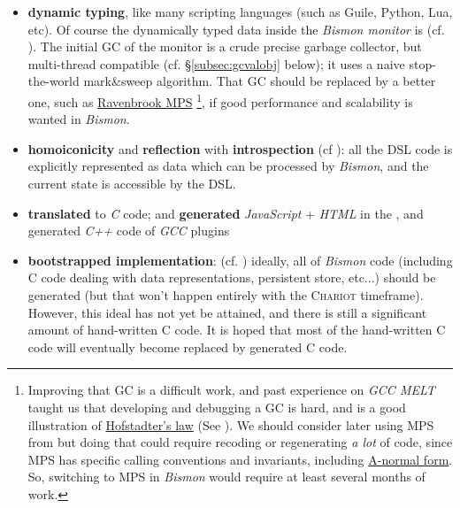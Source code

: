 \begin{itemize}
  \item \textbf{dynamic typing}, like many scripting languages (such
    as Guile, Python, Lua, etc). Of course the dynamically typed data
    inside the \textit{Bismon monitor} is 
    (cf. \cite{Jones:2011:GC-handbook}). The initial GC of the monitor
    is a crude precise garbage collector, but multi-thread compatible (cf. §\ref{subsec:gcvalobj} below);
    it uses a naive stop-the-world mark\&sweep algorithm. That GC
    should be replaced by a better one, such as
    \href{https://www.ravenbrook.com/project/mps/}{Ravenbrook MPS}
    \footnote{\label{fn:initial-gc} Improving that GC is a difficult
      work, and past experience on \emph{GCC MELT} taught us that
      developing and debugging a GC is hard, and is a good
      illustration of
      \href{https://en.wikipedia.org/wiki/Hofstadter's_law}{Hofstadter's
        law} (See \cite{Hofstadter:1979:GEB}). We should consider
      later using MPS from
       but doing that
      could require recoding or regenerating \emph{a lot} of code,
      since MPS has specific calling conventions and invariants,
      including
      \href{https://en.wikipedia.org/wiki/A-normal_form}{A-normal
        form}. So, switching to MPS in \emph{Bismon} would require at
      least several months of work.}, if good performance and
    scalability is wanted in \emph{Bismon}.

  \item \textbf{homoiconicity} and \textbf{reflection} with
    \textbf{introspection} (cf \cite{Pitrat:1996:FGCS,
      Pitrat:1990:Metaconnaissances, Pitrat:2009:AST,
      Pitrat:2009:ArtifBeings}): all the DSL code is explicitly
    represented as data which can be processed by \textit{Bismon}, and
    the current state is accessible by the DSL.

    \item \textbf{translated} to \emph{C} code; and \textbf{generated}
      \emph{JavaScript} + \emph{HTML} in the , and generated
      \emph{C++} code of \emph{GCC} plugins 

    \item \textbf{bootstrapped implementation}:  (cf. \cite{Pitrat:1996:FGCS, Polito:2014:Bootstrapping-pharo})
      ideally, all of \textit{Bismon} code (including C code dealing
      with data representations, persistent store, etc...) should be
      generated (but that won't happen entirely with the
      \textsc{Chariot} timeframe). However, this ideal has not yet be
      attained, and there is still a significant amount of
      hand-written C code. It is hoped that most of the hand-written C
      code will eventually become replaced by generated C code.
      

\end{itemize}
